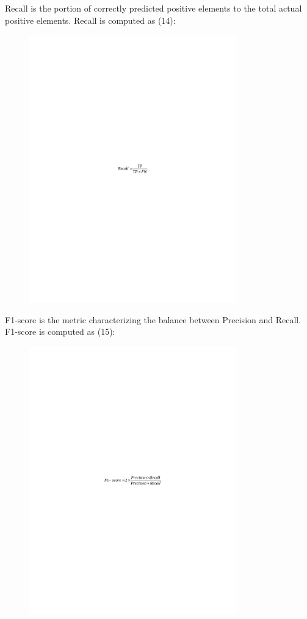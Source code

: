 Recall is the portion of correctly predicted positive elements to the
total actual positive elements. Recall is computed as (14):

\begin{figure}[H]
	\centering
	\includegraphics[width=0.8\textwidth]{media/ict/image83}
	\caption*{}
\end{figure}


F1-score is the metric characterizing the balance between Precision and
Recall. F1-score is computed as (15):

\begin{figure}[H]
	\centering
	\includegraphics[width=0.8\textwidth]{media/ict/image84}
	\caption*{}
\end{figure}


